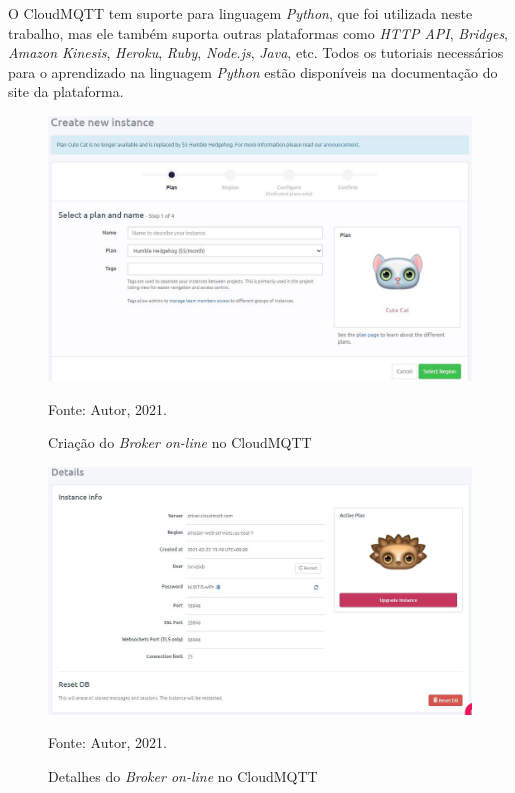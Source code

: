 \documentclass[
12pt,
openany, %
oneside, %
a4paper,			
english,			
brazil			        %
]{abntbibufjf}
\begin{document}
	O CloudMQTT tem suporte para linguagem \textit{Python}, que foi utilizada neste trabalho, mas ele também suporta outras plataformas como \textit{HTTP API}, \textit{Bridges}, \textit{Amazon Kinesis}, \textit{Heroku}, \textit{Ruby}, \textit{Node.js}, \textit{Java}, etc. Todos os tutoriais necessários para o aprendizado na linguagem \textit{Python} estão disponíveis na documentação do site da plataforma.
	
	\begin{figure}[!htb]
		\centering
		\includegraphics[scale=0.5]{Figuras/interfaceCriaInstancia.JPG}
		\caption{Criação do \textit{Broker on-line} no CloudMQTT}
		\label{brokerMQTT}
		\par Fonte: Autor, 2021.
	\end{figure}
	
	\begin{figure}[!htb]
		\centering
		\includegraphics[scale=0.5]{Figuras/detalhesInstancia.JPG}
		\caption{Detalhes do \textit{Broker on-line} no CloudMQTT}
		\label{detalhesMQTT}
		\par Fonte: Autor, 2021.
	\end{figure}
	
\end{document}
